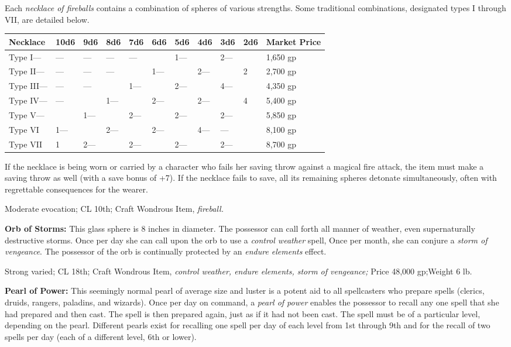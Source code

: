 \documentclass{article}
\begin{document}
Each \textit{necklace of fireballs }contains a combination of spheres of various 
strengths. Some traditional combinations, designated types I through VII, are detailed 
below.

\begin{tabular}{|>{\raggedright}p{35pt}|>{\raggedright}p{18pt}|>{\raggedright}p{13pt}|>{\raggedright}p{13pt}|>{\raggedright}p{13pt}|>{\raggedright}p{13pt}|>{\raggedright}p{13pt}|>{\raggedright}p{13pt}|>{\raggedright}p{13pt}|>{\raggedright}p{13pt}|>{\raggedright}p{53pt}|}
\hline
N\textbf{ecklace} & 1\textbf{0d6} & 9\textbf{d6} & 8\textbf{d6} & 7\textbf{d6} & 6\textbf{d6} & 5\textbf{d6} & 4\textbf{d6} & 3\textbf{d6} & 2\textbf{d6} & M\textbf{arket 
Price}\tabularnewline
\hline
Type I--- & --- & --- & --- & --- &  & 1--- &  & 2--- &  & 1,650 gp\tabularnewline
\hline
Type II--- & --- & --- & --- &  & 1--- &  & 2--- &  & 2 & 2,700 gp\tabularnewline
\hline
Type III--- & --- & --- &  & 1--- &  & 2--- &  & 4--- &  & 4,350 gp\tabularnewline
\hline
Type IV--- & --- &  & 1--- &  & 2--- &  & 2--- &  & 4 & 5,400 gp\tabularnewline
\hline
Type V--- &  & 1--- &  & 2--- &  & 2--- &  & 2--- &  & 5,850 gp\tabularnewline
\hline
Type VI & 1--- &  & 2--- &  & 2--- &  & 4--- & --- &  & 8,100 gp\tabularnewline
\hline
Type VII & 1 & 2--- &  & 2--- &  & 2--- &  & 2--- &  & 8,700 gp\tabularnewline
\hline
\end{tabular}

If the necklace is being worn or carried by a character who fails her saving throw 
against a magical fire attack, the item must make a saving throw as well (with 
a save bonus of +7). If the necklace fails to save, all its remaining spheres detonate 
simultaneously, often with regrettable consequences for the wearer.

Moderate evocation; CL 10th; Craft Wondrous Item, \textit{fireball. }

\textbf{Orb of Storms:} This glass sphere is 8 inches in diameter. The possessor 
can call forth all manner of weather, even supernaturally destructive storms. Once 
per day she can call upon the orb to use a \textit{control weather }spell, Once 
per month, she can conjure a \textit{storm of vengeance}. The possessor of the 
orb is continually protected by an \textit{endure elements }effect.

Strong varied; CL 18th; Craft Wondrous Item, \textit{control weather, endure elements, 
storm of vengeance; }Price 48,000 gp;Weight 6 lb.

\textbf{Pearl of Power:} This seemingly normal pearl of average size and luster 
is a potent aid to all spellcasters who prepare spells (clerics, druids, rangers, 
paladins, and wizards). Once per day on command, a \textit{pearl of power }enables 
the possessor to recall any one spell that she had prepared and then cast. The 
spell is then prepared again, just as if it had not been cast. The spell must be 
of a particular level, depending on the pearl. Different pearls exist for recalling 
one spell per day of each level from 1st through 9th and for the recall of two 
spells per day (each of a different level, 6th or lower).
\end{document}
